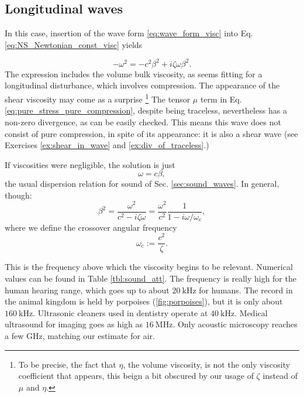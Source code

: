 \subsection{Longitudinal waves}

In this case, insertion of the wave form \ref{eq:wave_form_visc} into
Eq. \ref{eq:NS_Newtonian_const_visc} yields

\begin{equation}
  -\omega^2 = - c^2\beta^2 + i \zeta  \omega \beta^2 .
\end{equation}
The expression includes the volume bulk viscosity, as seems fitting
for a longitudinal disturbance, which involves compression.  The
appearance of the shear viscosity may come as a surprise \footnote{%
  To be precise, the fact that $\eta$, the volume viscosity, is not
  the only viscosity coefficient that appears, this beign a bit
  obscured by our usage of $\zeta$ instead of $\mu$ and $\eta$.}  The
tensor $\mu$ term in Eq. \ref{eq:pure_stress_pure_compression},
despite being traceless, nevertheless has a non-zero divergence, as
can be easily checked.  This means this wave does not consist of pure
compression, in spite of its appearance: it is also a shear wave (see
Exercises \ref{ex:shear_in_wave} and \ref{ex:div_of_traceless}.)


If viscosities were negligible, the solution is just
\[
\omega =  c \beta ,
\]
%
the usual dispersion relation for sound of
Sec. \ref{sec:sound_waves}. In general, though:
\begin{equation}
  \label{eq:waves_att_dispersion}
  \beta^2 =
  \frac{\omega^2}{c^2 - i \zeta\omega}=
  \frac{\omega^2}{c^2}\frac{1}{1 -  i\omega/\omega_\mathrm{c}},
\end{equation}
where we define the crossover angular frequency 
\[
  \omega_\mathrm{c} := \frac{c^2}{ \zeta }.
\]

This is the frequency above which the viscosity begins to be relevant.
Numerical values can be found in Table \ref{tbl:sound_att}. The
frequency is really high for the human hearing range, which goes up to
about $\SI{20}{\kilo\hertz}$ for humans. The record in the animal
kingdom is held by porpoises (\ref{fig:porpoises}), but it is only
about $\SI{160}{\kilo\hertz}$. Ultrasonic cleaners used in dentistry
operate at $\SI{40}{\kilo\hertz}$. Medical ultrasound for imaging goes
as high as $\SI{16}{\mega\hertz}$. Only acoustic microscopy
\cite{wiki:AM} reaches a few \si{\giga\hertz}, matching our estimate
for air.


